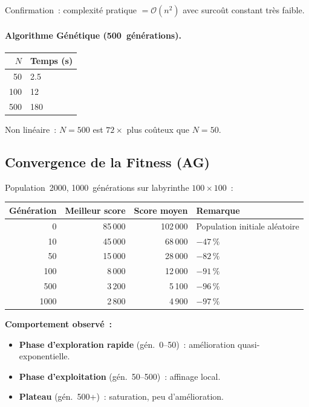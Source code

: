 \documentclass[12pt, a4paper]{article}
\theoremstyle{definition}
\theoremstyle{remark}
\newcommand{\bigO}[1]{\mathcal{O}\!\left(#1\right)}
\begin{document}
Confirmation~: complexité pratique $= \bigO{n^2}$ avec surcoût constant très faible.

\paragraph{Algorithme Génétique (500~générations).}

\begin{center}
\begin{tabular}{rl}
    \toprule
    $N$ & Temps (s) \\
    \midrule
    50  & 2.5  \\
    100 & 12   \\
    500 & 180  \\
    \bottomrule
\end{tabular}
\end{center}

Non linéaire~: $N = 500$ est $72\times$ plus coûteux que $N = 50$.

\subsection{Convergence de la Fitness (AG)}

Population~2000, 1000~générations sur labyrinthe $100 \times 100$~:

\begin{center}
\begin{tabular}{rrrp{4cm}}
    \toprule
    Génération & Meilleur score & Score moyen & Remarque \\
    \midrule
    0    & 85\,000 & 102\,000 & Population initiale aléatoire \\
    10   & 45\,000 & 68\,000  & $-47\,\%$ \\
    50   & 15\,000 & 28\,000  & $-82\,\%$ \\
    100  & 8\,000  & 12\,000  & $-91\,\%$ \\
    500  & 3\,200  & 5\,100   & $-96\,\%$ \\
    1000 & 2\,800  & 4\,900   & $-97\,\%$ \\
    \bottomrule
\end{tabular}
\end{center}

\textbf{Comportement observé~:}
\begin{itemize}[noitemsep]
    \item \textbf{Phase d'exploration rapide} (gén.~0–50)~: amélioration quasi-exponentielle.
    \item \textbf{Phase d'exploitation} (gén.~50–500)~: affinage local.
    \item \textbf{Plateau} (gén.~500+)~: saturation, peu d'amélioration.
\end{itemize}
\end{document}
